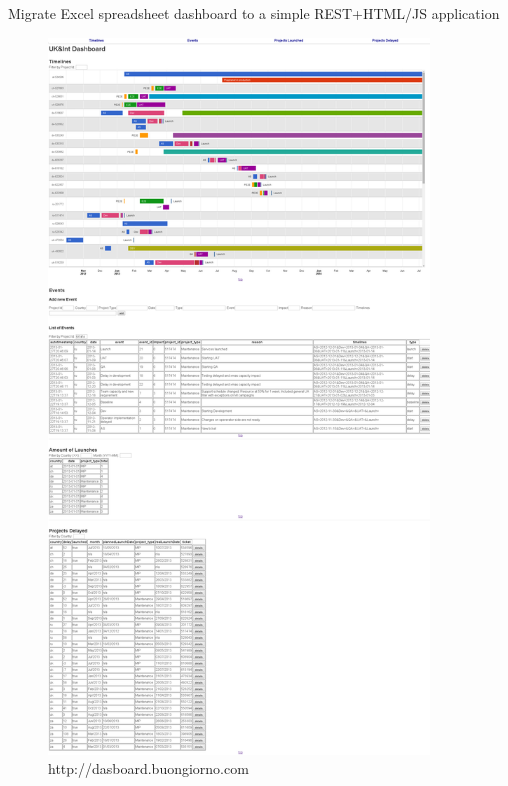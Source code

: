 \begin{part}{Migrate Excel spreadsheet dashboard to a simple REST+HTML/JS
application}
\begin{figure}[ht!]
	\centering
   	\includegraphics[width=0.9\textwidth]{./resources/dashboard.png}
   	\caption{http://dasboard.buongiorno.com}
   	\label{f_dashboard}
\end{figure}

%
\end{part}